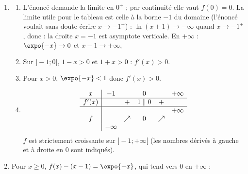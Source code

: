 \begin{enumerate}
\begin{enumerate}
            \par\noindent{}
            Le point $O$ est un point anguleux de $\Courbe$, avec deux demi-tangentes : $y = x$ ($x \leq 0$) et $y = 0$ ($x \geq 0$).
      \end{enumerate}
   \item
      \begin{enumerate}
         \item {}
            L'\'enonc\'e demande la limite en $0^+$ ; par continuit\'e elle vaut $f(0) = 0$. La limite utile pour le tableau
            est celle \`a la borne $-1$ du domaine (l'\'enonc\'e voulait sans doute \'ecrire $x \to -1^+$) :
            $\ln(x + 1) \to -\infty$ quand $x \to -1^+$, donc  : la droite $x = -1$ est asymptote verticale.
            En $+\infty$ : $\expo{-x} \to 0$ et $x - 1 \to +\infty$, 
         \item \vln{D\'eriv\'ee sur $]-1 ; 0[$ :}
            \par\noindent{}
            Sur $]-1 ; 0[$, $1 - x > 0$ et $1 + x > 0$ : $f'(x) > 0$.
         \item \vln{D\'eriv\'ee sur $]0 ; +\infty[$ :}
            \par\noindent{} Pour $x > 0$, $\expo{-x} < 1$ donc $f'(x) > 0$.
         \item {}
            \[
               \begin{array}{c|ccccc}
                  x & -1 & & 0 & & +\infty \\ \hline
                  f'(x) & & + & 1 \;\|\; 0 & + & \\ \hline
                  & & & & & +\infty \\
                  f & & \nearrow & 0 & \nearrow & \\
                  & -\infty & & & &
               \end{array}
            \]
            $f$ est strictement croissante sur $]-1 ; +\infty[$ (les nombres d\'eriv\'es \`a gauche et \`a droite en $0$ sont indiqu\'es).
      \end{enumerate}
   \item {}
      Pour $x \geq 0$, $f(x) - (x - 1) = \expo{-x}$, qui tend vers $0$ en $+\infty$ :

\end{enumerate}
